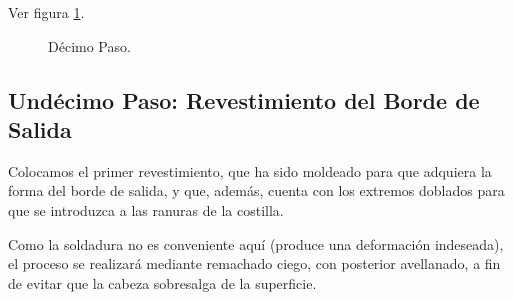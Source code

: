 Ver figura \ref{fig:dec}.

\begin{figure}[!htb]
\centering
{}
\caption{Décimo Paso. \label{fig:dec}}
\end{figure}


\subsection{Undécimo Paso: Revestimiento del Borde de Salida}
Colocamos el primer revestimiento, que ha sido moldeado para que adquiera la forma del borde de salida, y que, además, cuenta con los extremos doblados para que se introduzca a las ranuras de la costilla.

Como la soldadura no es conveniente aquí (produce una deformación indeseada), el proceso se realizará mediante remachado ciego, con posterior avellanado, a fin de evitar que la cabeza sobresalga de la superficie. 

